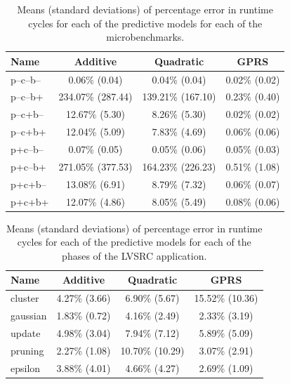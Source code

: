 \begin{table}
\small
\begin{tabular}{|l|c|c|c|}
\hline
Name & Additive & Quadratic & GPRS \\ \hline
 p--c--b-- & 0.06\% (0.04) & 0.04\% (0.04) &0.02\% (0.02) \\ \hline
 p--c--b+ &   234.07\% (287.44) & 139.21\% (167.10) &  0.23\% (0.40)   \\ \hline
 p--c+b-- &  12.67\% (5.30) &  8.26\% (5.30) &  0.02\% (0.02) \\ \hline
 p--c+b+ &  12.04\% (5.09) &  7.83\% (4.69) & 0.06\% (0.06)  \\ \hline
 p+c--b-- &  0.07\% (0.05) &  0.05\% (0.06)  &  0.05\% (0.03)  \\ \hline
 p+c--b+ &  271.05\% (377.53) & 164.23\% (226.23) & 0.51\% (1.08) \\ \hline
 p+c+b--&  13.08\% (6.91) & 8.79\% (7.32) & 0.06\% (0.07) \\ \hline
 p+c+b+&  12.07\% (4.86) &  8.05\% (5.49) & 0.08\% (0.06)  \\ \hline 
   \end{tabular}
 \caption{Means (standard deviations) of percentage error in runtime cycles for each of the predictive models for each of the microbenchmarks.}
\label{table:acc-cycles}
\end{table}

\begin{table}
\small
\begin{tabular}{|l|c|c|c|}
\hline
Name & Additive & Quadratic & GPRS \\ \hline
 cluster &  4.27\% (3.66) & 6.90\% (5.67)  & 15.52\% (10.36)  \\ \hline
 gaussian&  1.83\% (0.72) & 4.16\% (2.49) & 2.33\% (3.19)  \\ \hline
 update&  4.98\% (3.04) & 7.94\% (7.12)  & 5.89\% (5.09)  \\ \hline
 pruning&  2.27\% (1.08) & 10.70\% (10.29)  & 3.07\% (2.91)  \\ \hline
 epsilon &  3.88\% (4.01) & 4.66\% (4.27)  & 2.69\% (1.09)  \\ \hline  
   \end{tabular}
 \caption{Means (standard deviations) of percentage error in runtime cycles for each of the predictive models for each of the phases of the LVSRC application.}
\label{table:acc-cycles-lvsrc}
\end{table}
 
